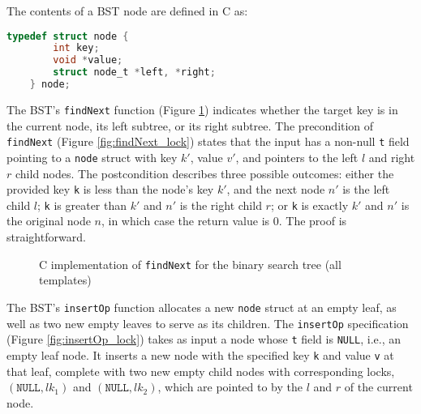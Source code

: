 \documentclass[sigplan,10pt,anonymous,review]{acmart}\settopmatter{printfolios=true,printccs=false,printacmref=false}
\begin{document}
The contents of a BST node are defined in C as:
\begin{lstlisting}[language = C, backgroundcolor=\color{white}, basicstyle=\ttfamily\footnotesize]
	typedef struct node {
		int key; 
		void *value; 
		struct node_t *left, *right;
	} node;
\end{lstlisting}
The BST's \lstinline{findNext} function (Figure \ref{findnext}) indicates whether the target key is in the current node, its left subtree, or its right subtree. The precondition of \texttt{findNext} (Figure \ref*{fig:findNext_lock}) states that the input has a non-null \texttt{t} field pointing to a \texttt{node} struct with key $k'$, value $v'$, and pointers to the left $l$ and right $r$ child nodes. The postcondition describes three possible outcomes: either the provided key \texttt{k} is less than the node's key $k'$, and the next node $n'$ is the left child $l$; \lstinline{k} is greater than $k'$ and $n'$ is the right child $r$; or \lstinline{k} is exactly $k'$ and $n'$ is the original node $n$, in which case the return value is 0. The proof is straightforward.

\begin{figure}[ht]
	 
	\caption{C implementation of \lstinline{findNext} for the binary search tree (all templates)}
	\label{findnext}
\end{figure}

The BST's \lstinline{insertOp} function allocates a new \lstinline{node} struct at an empty leaf, as well as two new empty leaves to serve as its children. The \texttt{insertOp} specification (Figure \ref{fig:insertOp_lock}) takes as input a node whose \lstinline{t} field is \lstinline{NULL}, i.e., an empty leaf node. It inserts a new node with the specified key \texttt{k} and value \texttt{v} at that leaf, complete with two new empty child nodes with corresponding locks, $(\texttt{NULL}, \mathit{lk}_1)$ and $(\texttt{NULL}, \mathit{lk}_2)$, which are pointed to by the $l$ and $r$ of the current node.
\end{document}
